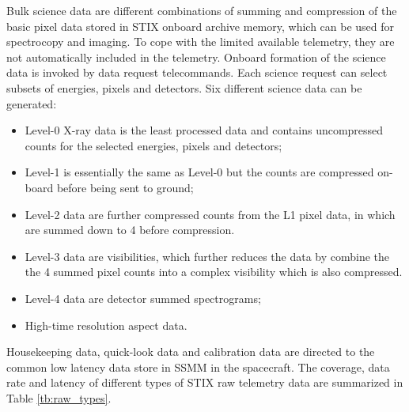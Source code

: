 \documentclass{aa}
\begin{document}
Bulk science data are different combinations of summing and compression of the basic pixel data stored in STIX onboard archive memory, which can be used for spectrocopy and imaging.
To cope with the limited available telemetry, they are not automatically included in the telemetry.
Onboard formation of the science data is invoked by data request telecommands.
Each science request can select subsets of energies, pixels and detectors.
Six different science data can be generated:
\begin{itemize}
 \item Level-0 X-ray data is the least processed data and contains uncompressed counts for the selected energies, pixels and detectors;
\item Level-1 is essentially the same as Level-0 but the counts are compressed on-board before being sent to ground;
\item Level-2 data are further compressed counts from the L1 pixel data, in which are summed down to 4 before compression.
\item Level-3 data are visibilities, which further reduces the data by combine the the 4 summed pixel counts into a complex visibility which is also compressed.
\item Level-4 data are detector summed spectrograms;
\item High-time resolution aspect data.
\end{itemize}
\begin{table}[h]
\centering
\caption{STIX raw telemetry data converage, data rate and typical reception delay at SDC.  }
\label{tb:raw_types}
\end{table}

Housekeeping data, quick-look data and calibration data are directed to the
common low latency data store  in SSMM in the spacecraft.
The coverage, data rate and latency of
different types of STIX raw telemetry data are
summarized in Table \ref{tb:raw_types}.
\end{document}
